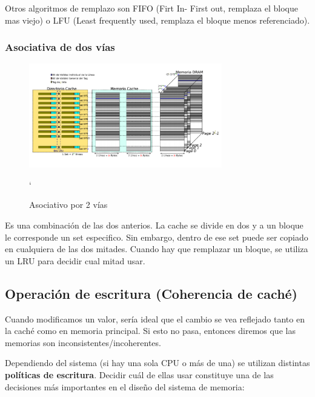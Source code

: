 Otros algoritmos de remplazo son FIFO (Firt In- First out, remplaza el bloque mas viejo) o LFU (Least frequently used, remplaza el bloque menos referenciado).

\subsubsection{Asociativa de dos vías}
\begin{figure}[ht]
	\centering
	\includegraphics[width=0.75\textwidth]{imagenes/cache-asociativo-vias}
	\caption{Asociativo por 2 vías}
`	\label{fig:asociativo-mapping}
\end{figure}

Es una combinación de las dos anterios. La cache se divide en dos y a un bloque le corresponde un set especifico. Sin embargo, dentro de ese set puede ser copiado en cualquiera de las dos mitades. Cuando hay que remplazar un bloque, se utiliza un LRU para decidir cual mitad usar.


\subsection{Operación de escritura (Coherencia de caché)}

Cuando modificamos un valor, sería ideal que el cambio se vea reflejado tanto en la caché como en memoria principal. Si esto no pasa, entonces diremos que las memorias son inconsistentes/incoherentes.

Dependiendo del sistema (si hay una sola CPU o más de una) se utilizan distintas \textbf{políticas de escritura}. Decidir cuál de ellas usar constituye una de las decisiones más importantes en el diseño del sistema de memoria:


